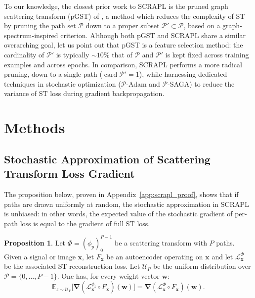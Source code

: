 \documentclass{article} %
\theoremstyle{plain}
\theoremstyle{definition}
\newtheorem{prop}[thm]{Proposition}
\theoremstyle{remark}
\DeclareMathOperator{\Card}{card}
\begin{document}
To our knowledge, the closest prior work to SCRAPL is the pruned graph scattering transform (pGST) of
\cite{ioannidis2020pruned}, a method which reduces the complexity of ST by pruning the path set $\mathcal{P}$ down to a proper subset $\mathcal{P}'\subset\mathcal{P}$, based on a graph-spectrum-inspired criterion.
Although both pGST and SCRAPL share a similar overarching goal, let us point out that pGST is a feature selection method: the cardinality of $\mathcal{P}'$ is typically $\sim 10\%$ that of $\mathcal{P}$ and $\mathcal{P}'$ is kept fixed across training examples and across epochs.
In comparison, SCRAPL performs a more radical pruning, down to a single path ($\Card\mathcal{P}'=1$), while harnessing dedicated techniques in stochastic optimization ($\mathcal{P}$-Adam and $\mathcal{P}$-SAGA) to reduce the variance of ST loss during gradient backpropagation.


\section{Methods}
\label{sec:methods}

\subsection{Stochastic Approximation of Scattering Transform Loss Gradient}
\label{ssec:stochastic_approx}

The proposition below, proven in Appendix~\ref{app:scrapl_proof}, shows that if paths are drawn uniformly at random, the stochastic approximation in SCRAPL is unbiased: in other words, the expected value of the stochastic gradient of per-path loss is equal to the gradient of full ST loss.


\begin{prop}
Let $\Phi = (\phi_{p})_{0}^{P-1}$ be a scattering transform with $P$ paths.
Given a signal or image $\boldsymbol{x}$, let $F_{\boldsymbol{x}}$ be an autoencoder operating on $\boldsymbol{x}$ and let $\mathcal{L}_{\boldsymbol{x}}^{\Phi}$ be the associated ST reconstruction loss.
Let $\mathcal{U}_P$ be the uniform distribution over $\mathcal{P}=\{0, \ldots,P-1\}$.
One has, for every weight vector $\boldsymbol{w}$:
\begin{equation}
\mathbb{E}_{z\sim\mathcal{U}_P}\big[\boldsymbol{\nabla}(\mathcal{L}_{\boldsymbol{x}}^{\phi_z}\circ F_{\boldsymbol{x}})(\boldsymbol{w})\big] = \boldsymbol{\nabla}(\mathcal{L}_{\boldsymbol{x}}^{\Phi}\circ F_{\boldsymbol{x}})(\boldsymbol{w}).
\end{equation}
\label{prop:unbiased}
\end{prop}
\end{document}
